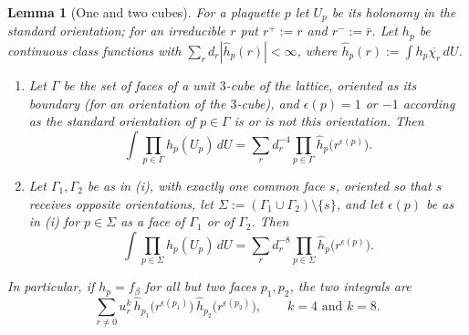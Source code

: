 \documentclass[11pt,a4paper]{article}
\newtheorem{lemma}[theorem]{Lemma}
\theoremstyle{definition}
\theoremstyle{remark}
\newcommand{\dU}{\,dU}
\begin{document}
\begin{lemma}[One and two cubes]\label{mg:lem:twocubes}
For a plaquette $p$ let $U_p$ be its holonomy in the standard orientation; for an irreducible $r$ put $r^+:=r$ and $r^-:=\bar r$. Let $h_p$ be continuous
class functions with $\sum_rd_r|\hat h_p(r)|<\infty$, where $\hat h_p(r):=\int h_p\overline{\chi_r}\dU$.
\begin{enumerate}[label=(\roman*)]
\item Let $\Gamma$ be the set of faces of a unit $3$-cube of the lattice, oriented as its boundary (for an orientation of the $3$-cube), and $\epsilon(p)=1$ or
$-1$ according as the standard orientation of $p\in\Gamma$ is or is not this orientation. Then
\[
\int\prod_{p\in\Gamma}h_p(U_p)\dU=\sum_rd_r^{-4}\prod_{p\in\Gamma}\hat h_p\bigl(r^{\epsilon(p)}\bigr).
\]
\item Let $\Gamma_1,\Gamma_2$ be as in (i), with exactly one common face $s$, oriented so that $s$ receives opposite orientations, let
$\Sigma:=(\Gamma_1\cup\Gamma_2)\setminus\{s\}$, and let $\epsilon(p)$ be as in (i) for $p\in\Sigma$ as a face of $\Gamma_1$ or of $\Gamma_2$. Then
\[
\int\prod_{p\in\Sigma}h_p(U_p)\dU=\sum_rd_r^{-8}\prod_{p\in\Sigma}\hat h_p\bigl(r^{\epsilon(p)}\bigr).
\]
\end{enumerate}
In particular, if $h_p=f_\beta$ for all but two faces $p_1,p_2$, the two integrals are
\[
\sum_{r\neq0}u_r^k\,\hat h_{p_1}\bigl(r^{\epsilon(p_1)}\bigr)\,\hat h_{p_2}\bigl(r^{\epsilon(p_2)}\bigr),\qquad k=4\text{ and }k=8 .
\]
\end{lemma}
\end{document}
